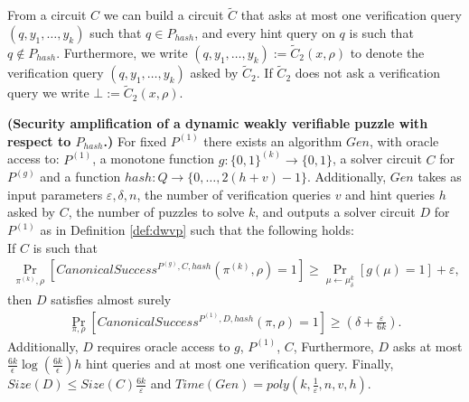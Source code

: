 %
From a circuit $C$ we can build a circuit $\widetilde{C}$ that asks at most one verification query
$(q, y_1, \dots, y_k)$ such that $q \in P_{hash}$, and every hint query on $q$ is such that $q \notin P_{hash}$.
Furthermore, we write $(q, y_1, \dots, y_k) := \widetilde{C}_2(x, \rho)$ to denote
the verification query $(q, y_1, \dots, y_k)$ asked by $\widetilde{C}_2$.
If $\widetilde{C}_2$ does not ask a verification query we write $\bot := \widetilde{C}_2(x, \rho)$.
%
%
\begin{lemma}\textbf{(Security amplification of a dynamic weakly verifiable puzzle with respect to $P_{hash}$.)}
  \label{lemma:sec_amp_for_p_hash}
  For fixed $P^{(1)}$ there exists an algorithm $Gen$, with oracle access to:
  $P^{(1)}$, a monotone function $g:\{0,1\}^{(k)} \rightarrow \{0,1\}$,
  a solver circuit $C$ for $P^{(g)}$ and a function $hash : Q \rightarrow \{0, \dots, 2(h+v)-1\}$.
  Additionally, $Gen$ takes as input parameters $\varepsilon, \delta, n$,
  the number of verification queries $v$ and hint queries $h$ asked by $C$, the number of puzzles to solve $k$,
  and outputs a solver circuit $D$ for $P^{(1)}$ as in Definition \ref{def:dwvp}
  such that the following holds: \\
  If $C$ is such that \\
  \begin{align*}
    \underset{\pi^{(k)}, \rho}{\Pr}\left[CanonicalSuccess^{P^{(g)}, C, hash}(\pi^{(k)}, \rho)=1\right] \geq \underset{\mu \leftarrow \mu_\delta^k}{\Pr}[g(\mu) = 1] + \varepsilon,
  \end{align*}
  then $D$ satisfies almost surely
  \begin{align*}
    \underset{\pi, \rho}{\Pr}\left[CanonicalSuccess^{P^{(1)}, D, hash}(\pi, \rho)=1\right] \geq (\delta + \frac{\varepsilon}{6k}).
  \end{align*}
  Additionally, $D$ requires oracle access to $g$, $P^{(1)}$, $C$,
  Furthermore, $D$ asks at most $\frac{6k}{\epsilon}\log\left(\frac{6k}{\epsilon}\right) h$ hint queries and at most one verification query.
  Finally, $Size(D) \leq Size(C)\frac{6k}{\varepsilon}$ and $Time(Gen) = poly(k, \frac{1}{\varepsilon}, n, v, h)$.
\end{lemma}
%
